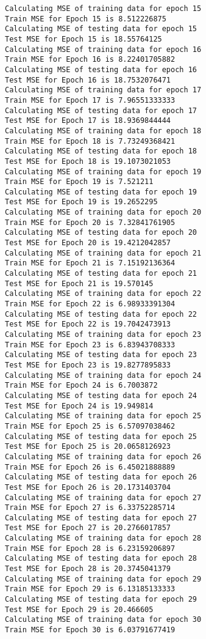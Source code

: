 \documentclass{article}
\begin{document}
\begin{Verbatim}[commandchars=\\\{\}]
Calculating MSE of training data for epoch 15
Train MSE for Epoch 15 is 8.512226875
Calculating MSE of testing data for epoch 15
Test MSE for Epoch 15 is 18.55764125
Calculating MSE of training data for epoch 16
Train MSE for Epoch 16 is 8.22401705882
Calculating MSE of testing data for epoch 16
Test MSE for Epoch 16 is 18.7532076471
Calculating MSE of training data for epoch 17
Train MSE for Epoch 17 is 7.96551333333
Calculating MSE of testing data for epoch 17
Test MSE for Epoch 17 is 18.9369844444
Calculating MSE of training data for epoch 18
Train MSE for Epoch 18 is 7.73249368421
Calculating MSE of testing data for epoch 18
Test MSE for Epoch 18 is 19.1073021053
Calculating MSE of training data for epoch 19
Train MSE for Epoch 19 is 7.521211
Calculating MSE of testing data for epoch 19
Test MSE for Epoch 19 is 19.2652295
Calculating MSE of training data for epoch 20
Train MSE for Epoch 20 is 7.32841761905
Calculating MSE of testing data for epoch 20
Test MSE for Epoch 20 is 19.4212042857
Calculating MSE of training data for epoch 21
Train MSE for Epoch 21 is 7.15192136364
Calculating MSE of testing data for epoch 21
Test MSE for Epoch 21 is 19.570145
Calculating MSE of training data for epoch 22
Train MSE for Epoch 22 is 6.98933391304
Calculating MSE of testing data for epoch 22
Test MSE for Epoch 22 is 19.7042473913
Calculating MSE of training data for epoch 23
Train MSE for Epoch 23 is 6.83943708333
Calculating MSE of testing data for epoch 23
Test MSE for Epoch 23 is 19.8277895833
Calculating MSE of training data for epoch 24
Train MSE for Epoch 24 is 6.7003872
Calculating MSE of testing data for epoch 24
Test MSE for Epoch 24 is 19.949814
Calculating MSE of training data for epoch 25
Train MSE for Epoch 25 is 6.57097038462
Calculating MSE of testing data for epoch 25
Test MSE for Epoch 25 is 20.0658126923
Calculating MSE of training data for epoch 26
Train MSE for Epoch 26 is 6.45021888889
Calculating MSE of testing data for epoch 26
Test MSE for Epoch 26 is 20.1731403704
Calculating MSE of training data for epoch 27
Train MSE for Epoch 27 is 6.33752285714
Calculating MSE of testing data for epoch 27
Test MSE for Epoch 27 is 20.2766017857
Calculating MSE of training data for epoch 28
Train MSE for Epoch 28 is 6.23159206897
Calculating MSE of testing data for epoch 28
Test MSE for Epoch 28 is 20.3745041379
Calculating MSE of training data for epoch 29
Train MSE for Epoch 29 is 6.13185133333
Calculating MSE of testing data for epoch 29
Test MSE for Epoch 29 is 20.466605
Calculating MSE of training data for epoch 30
Train MSE for Epoch 30 is 6.03791677419

\end{Verbatim}
\end{document}
